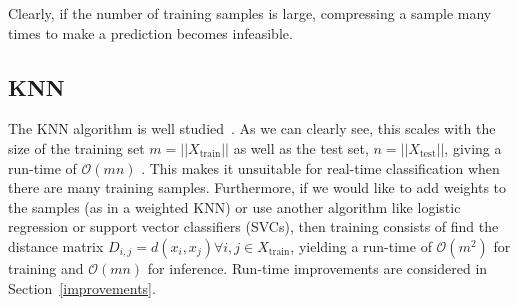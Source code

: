 \documentclass[conference]{IEEEtran}
\begin{document}
Clearly, if the number of training samples is large, compressing a sample many times to make a prediction becomes infeasible. 



\subsection{KNN}
\label{runtime}
The KNN algorithm is well studied~\cite{}.
As we can clearly see, this scales with the size of the training set $m = || X_{\text{train}} || $ as well as the test set, $n = || X_{\text{test}} ||$, giving a run-time of $\mathcal{O}(mn)$ .
This makes it unsuitable for real-time classification when there are many training samples. 
Furthermore, if we would like to add weights to the samples (as in a weighted KNN) or use another algorithm like logistic regression or support vector classifiers (SVCs), then training consists of find the distance matrix $D_{i,j} = d(x_i, x_j) \forall i,j \in X_{\text{train}}$, yielding a run-time of $\mathcal{O}(m^2)$ for training and $\mathcal{O}(mn)$ for inference. 
Run-time improvements are considered in Section~\ref{improvements}.




\end{document}
